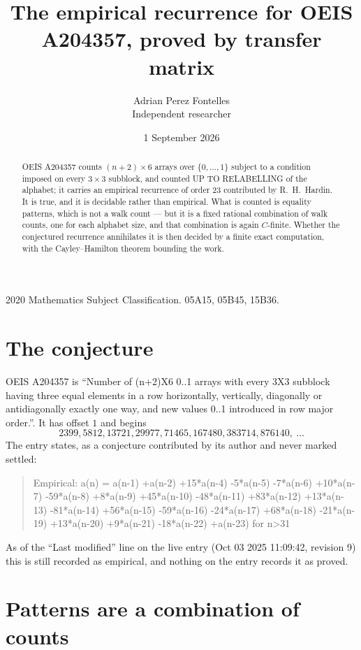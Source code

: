 \documentclass[11pt,a4paper]{article}
\title{The empirical recurrence for OEIS A204357, proved by transfer matrix}
\author{Adrian Perez Fontelles\\ \small Independent researcher}
\date{1 September 2026}
\theoremstyle{plain}
\theoremstyle{definition}
\begin{document}
\maketitle

\begin{abstract}
OEIS A204357 counts $(n+2)\times6$ arrays over $\{0,\dots,1\}$ subject to a condition imposed on
every $3\times3$ subblock, and counted UP TO RELABELLING of the
alphabet; it carries an empirical recurrence of order $23$ contributed by
R.~H.~Hardin. It is true, and it is decidable rather than empirical. What is counted is
equality patterns, which is not a walk count --- but it is a fixed rational combination of
walk counts, one for each alphabet size, and that combination is again $C$-finite. Whether the
conjectured recurrence annihilates it is then decided by a finite exact computation, with the
Cayley--Hamilton theorem bounding the work.
\end{abstract}

\noindent\small 2020 Mathematics Subject Classification. 05A15, 05B45, 15B36.\normalsize

\section{The conjecture}

OEIS A204357 is ``Number of (n+2)X6 0..1 arrays with every 3X3 subblock having three equal elements in a row horizontally, vertically, diagonally or antidiagonally exactly one way, and new values 0..1 introduced in row major order.''. It has offset $1$ and begins
\[
2399, 5812, 13721, 29977, 71465, 167480, 383714, 876140,\ \dots
\]
The entry states, as a conjecture contributed by its author and never marked settled:
\begin{quote}
Empirical: a(n) = a(n-1) +a(n-2) +15*a(n-4) -5*a(n-5) -7*a(n-6) +10*a(n-7) -59*a(n-8) +8*a(n-9) +45*a(n-10) -48*a(n-11) +83*a(n-12) +13*a(n-13) -81*a(n-14) +56*a(n-15) -59*a(n-16) -24*a(n-17) +68*a(n-18) -21*a(n-19) +13*a(n-20) +9*a(n-21) -18*a(n-22) +a(n-23) for n>31
\end{quote}
As of the ``Last modified'' line on the live entry (Oct 03 2025 11:09:42, revision 9) this is still
recorded as empirical, and nothing on the entry records it as proved.

\section{Patterns are a combination of counts}
\end{document}
